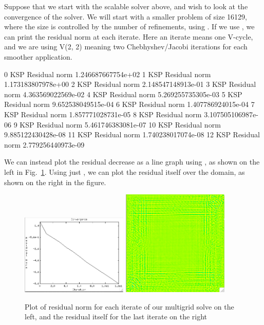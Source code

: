 Suppose that we start with the scalable solver above, and wish to look at the convergence of the solver. We will start with a smaller problem of size 16129, where the size is controlled by the number of refinements, using . If we use , we can print the residual norm at each iterate. Here an iterate means one V-cycle, and we are using V(2, 2) meaning two Chebhyshev/Jacobi iterations for each smoother application.
\begin{bash}
0 KSP Residual norm 1.246687667754e+02
1 KSP Residual norm 1.173183807978e+00
2 KSP Residual norm 2.148547148913e-01
3 KSP Residual norm 4.363569022569e-02
4 KSP Residual norm 5.269255735305e-03
5 KSP Residual norm 9.652538049515e-04
6 KSP Residual norm 1.407786924015e-04
7 KSP Residual norm 1.857771028731e-05
8 KSP Residual norm 3.107505106987e-06
9 KSP Residual norm 5.461746383081e-07
10 KSP Residual norm 9.885122430428e-08
11 KSP Residual norm 1.740238017074e-08
12 KSP Residual norm 2.779256440973e-09
\end{bash}
We can instead plot the residual decrease as a line graph using , as shown on the left in Fig.~\ref{fig:residualPlots}. Using just , we can plot the residual itself over the domain, as shown on the right in the figure.

\begin{figure}
\centering
\includegraphics[width=2in]{figures/residualLG.png}\hfil
\includegraphics[width=2in]{figures/residualLast.png}
\caption{Plot of residual norm for each iterate of our multigrid solve on the left, and the residual itself for the last iterate on the right\label{fig:residualPlots}}
\end{figure}


